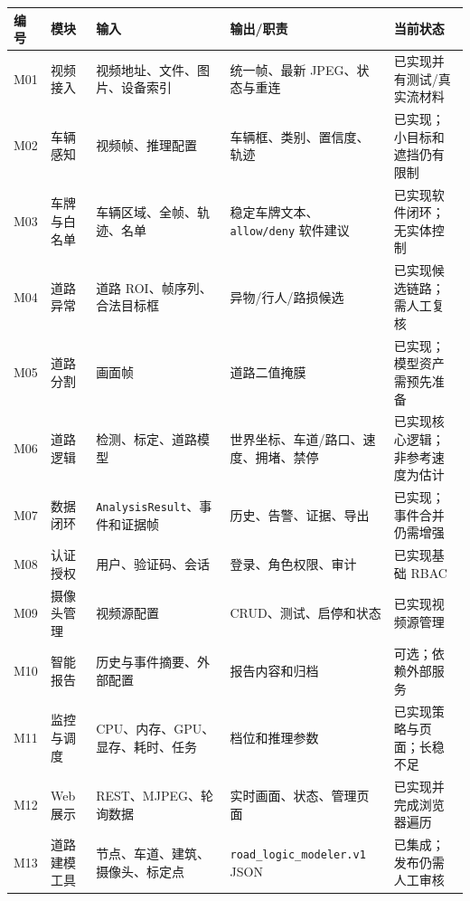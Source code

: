 \begin{longtable}[]{@{}
  >{\raggedright\arraybackslash}p{}
  >{\raggedright\arraybackslash}p{}
  >{\raggedright\arraybackslash}p{}
  >{\raggedright\arraybackslash}p{}
  >{\raggedright\arraybackslash}p{}@{}}
\toprule\noalign{}
\begin{minipage}[b]{\linewidth}\raggedright
编号
\end{minipage} & \begin{minipage}[b]{\linewidth}\raggedright
模块
\end{minipage} & \begin{minipage}[b]{\linewidth}\raggedright
输入
\end{minipage} & \begin{minipage}[b]{\linewidth}\raggedright
输出/职责
\end{minipage} & \begin{minipage}[b]{\linewidth}\raggedright
当前状态
\end{minipage} \\
\midrule\noalign{}
\endhead
\bottomrule\noalign{}
\endlastfoot
M01 & 视频接入 & 视频地址、文件、图片、设备索引 & 统一帧、最新 JPEG、状态与重连 & 已实现并有测试/真实流材料 \\
M02 & 车辆感知 & 视频帧、推理配置 & 车辆框、类别、置信度、轨迹 & 已实现；小目标和遮挡仍有限制 \\
M03 & 车牌与白名单 & 车辆区域、全帧、轨迹、名单 & 稳定车牌文本、\texttt{allow/\allowbreak{}deny} 软件建议 & 已实现软件闭环；无实体控制 \\
M04 & 道路异常 & 道路 ROI、帧序列、合法目标框 & 异物/行人/路损候选 & 已实现候选链路；需人工复核 \\
M05 & 道路分割 & 画面帧 & 道路二值掩膜 & 已实现；模型资产需预先准备 \\
M06 & 道路逻辑 & 检测、标定、道路模型 & 世界坐标、车道/路口、速度、拥堵、禁停 & 已实现核心逻辑；非参考速度为估计 \\
M07 & 数据闭环 & \texttt{Analysis\allowbreak{}Result}、事件和证据帧 & 历史、告警、证据、导出 & 已实现；事件合并仍需增强 \\
M08 & 认证授权 & 用户、验证码、会话 & 登录、角色权限、审计 & 已实现基础 RBAC \\
M09 & 摄像头管理 & 视频源配置 & CRUD、测试、启停和状态 & 已实现视频源管理 \\
M10 & 智能报告 & 历史与事件摘要、外部配置 & 报告内容和归档 & 可选；依赖外部服务 \\
M11 & 监控与调度 & CPU、内存、GPU、显存、耗时、任务 & 档位和推理参数 & 已实现策略与页面；长稳不足 \\
M12 & Web 展示 & REST、MJPEG、轮询数据 & 实时画面、状态、管理页面 & 已实现并完成浏览器遍历 \\
M13 & 道路建模工具 & 节点、车道、建筑、摄像头、标定点 & \texttt{road\_\allowbreak{}logic\_\allowbreak{}modeler.\allowbreak{}v1} JSON & 已集成；发布仍需人工审核 \\
\end{longtable}

